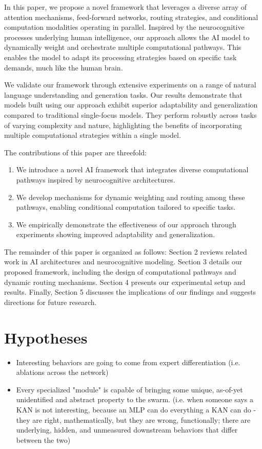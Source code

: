 \documentclass{article}
\begin{document}
In this paper, we propose a novel framework that leverages a diverse array of attention mechanisms, feed-forward networks, routing strategies, and conditional computation modalities operating in parallel. Inspired by the neurocognitive processes underlying human intelligence, our approach allows the AI model to dynamically weight and orchestrate multiple computational pathways. This enables the model to adapt its processing strategies based on specific task demands, much like the human brain.

We validate our framework through extensive experiments on a range of natural language understanding and generation tasks. Our results demonstrate that models built using our approach exhibit superior adaptability and generalization compared to traditional single-focus models. They perform robustly across tasks of varying complexity and nature, highlighting the benefits of incorporating multiple computational strategies within a single model.

The contributions of this paper are threefold:

\begin{enumerate} \item We introduce a novel AI framework that integrates diverse computational pathways inspired by neurocognitive architectures. \item We develop mechanisms for dynamic weighting and routing among these pathways, enabling conditional computation tailored to specific tasks. \item We empirically demonstrate the effectiveness of our approach through experiments showing improved adaptability and generalization. \end{enumerate}

The remainder of this paper is organized as follows: Section 2 reviews related work in AI architectures and neurocognitive modeling. Section 3 details our proposed framework, including the design of computational pathways and dynamic routing mechanisms. Section 4 presents our experimental setup and results. Finally, Section 5 discusses the implications of our findings and suggests directions for future research.

\section{Hypotheses}

\begin{itemize}
    \item Interesting behaviors are going to come from expert differentiation (i.e. ablations across the network)
    \item Every specialized "module" is capable of bringing some unique, as-of-yet unidentified and abstract property to the swarm. (i.e. when someone says a KAN is not interesting, because an MLP can do everything a KAN can do - they are right, mathematically, but they are wrong, functionally; there are underlying, hidden, and unmeasured downstream behaviors that differ between the two)
\end{itemize}
\end{document}
